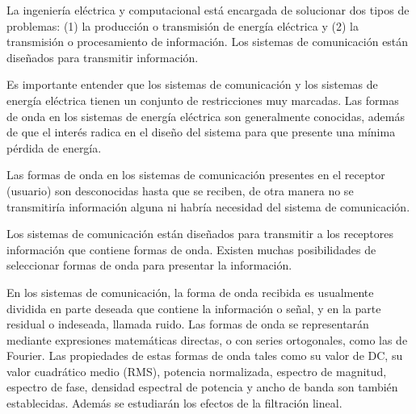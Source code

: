 
La ingeniería eléctrica y computacional está encargada de solucionar dos tipos de
problemas: (1) la producción o transmisión de energía eléctrica y (2) la transmisión o 
procesamiento de información. Los sistemas de comunicación están diseñados para 
transmitir información.

Es importante entender que los sistemas de comunicación y los sistemas de energía eléctrica
tienen un conjunto de restricciones muy marcadas. Las formas de onda en los sistemas de energía
eléctrica son generalmente conocidas, además de que el interés radica en el diseño del sistema para
que presente una mínima pérdida de energía.

Las formas de onda en los sistemas de comunicación presentes en el receptor (usuario) son
desconocidas hasta que se reciben, de otra manera no se transmitiría información alguna ni habría
necesidad del sistema de comunicación.

Los sistemas de comunicación están diseñados para transmitir a los receptores información
que contiene formas de onda. Existen muchas posibilidades de seleccionar formas de onda para
presentar la información.

En los sistemas de comunicación, la forma de onda recibida es usualmente dividida en parte 
deseada que contiene la información o señal, y en la parte residual o indeseada, llamada ruido.
Las formas de onda se representarán mediante expresiones matemáticas
directas, o con series ortogonales, como las de Fourier. Las propiedades de estas formas de 
onda tales como su valor de DC, su valor cuadrático medio (RMS), potencia normalizada, espectro 
de magnitud, espectro de fase, densidad espectral de potencia y ancho de banda son también 
establecidas. Además se estudiarán los efectos de la filtración lineal.

